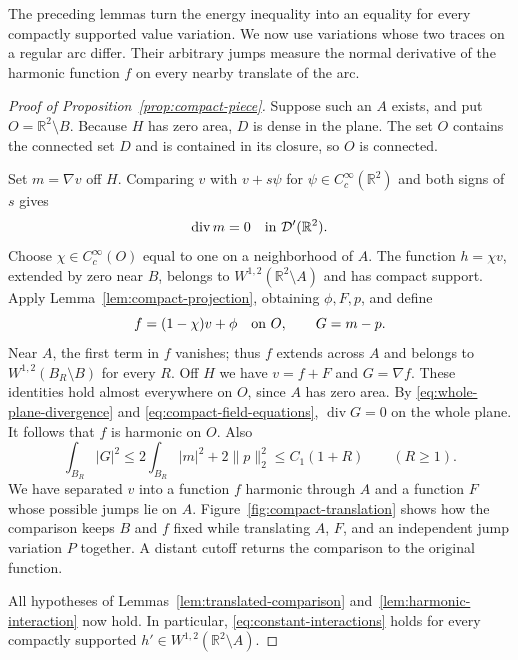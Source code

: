 The preceding lemmas turn the energy inequality into an equality for
every compactly supported value variation. We now use variations whose
two traces on a regular arc differ. Their arbitrary jumps measure the
normal derivative of the harmonic function $f$ on every nearby translate
of the arc.



\begin{proof}[Proof of Proposition~\ref{prop:compact-piece}]
Suppose such an $A$ exists, and put $O=\mathbb R^2\setminus B$.
Because $H$ has zero area, $D$ is dense in the plane. The set $O$
contains the connected set $D$ and is contained in its closure, so
$O$ is connected.

Set $m=\nabla v$ off $H$. Comparing $v$ with $v+s\psi$ for
$\psi\in C_c^\infty(\mathbb R^2)$ and both signs of $s$ gives
\begin{equation}
 \operatorname{div}m=0\quad\hbox{in }\mathcal D'(\mathbb R^2).
 \label{eq:whole-plane-divergence}
\end{equation}
Choose $\chi\in C_c^\infty(O)$ equal to one on a neighborhood of $A$.
The function $h=\chi v$, extended by zero near $B$, belongs to
$W^{1,2}(\mathbb R^2\setminus A)$ and has compact support.
Apply Lemma~\ref{lem:compact-projection}, obtaining $\phi,F,p$, and define
\[
 f=(1-\chi)v+\phi\quad\hbox{on }O,\qquad G=m-p.
\]
Near $A$, the first term in $f$ vanishes; thus $f$ extends across $A$
and belongs to $W^{1,2}(B_R\setminus B)$ for every $R$.
Off $H$ we have $v=f+F$ and $G=\nabla f$. These identities hold
almost everywhere on $O$, since $A$ has zero area.
By \eqref{eq:whole-plane-divergence} and
\eqref{eq:compact-field-equations}, $\operatorname{div}G=0$ on the
whole plane. It follows that $f$ is harmonic on $O$. Also
\begin{equation}
 \int_{B_R}|G|^2
      \leq 2\int_{B_R}|m|^2+2\|p\|_2^2
      \leq C_1(1+R)\qquad(R\geq1).
 \label{eq:external-field-growth}
\end{equation}
We have separated $v$ into a function $f$ harmonic through $A$ and a
function $F$ whose possible jumps lie on $A$. Figure~\ref{fig:compact-translation}
shows how the comparison keeps $B$ and $f$ fixed while translating $A$,
$F$, and an independent jump variation $P$ together. A distant cutoff
returns the comparison to the original function.


All hypotheses of Lemmas~\ref{lem:translated-comparison}
and~\ref{lem:harmonic-interaction} now hold. In particular,
\eqref{eq:constant-interactions} holds for every compactly supported
$h'\in W^{1,2}(\mathbb R^2\setminus A)$.


\end{proof}
